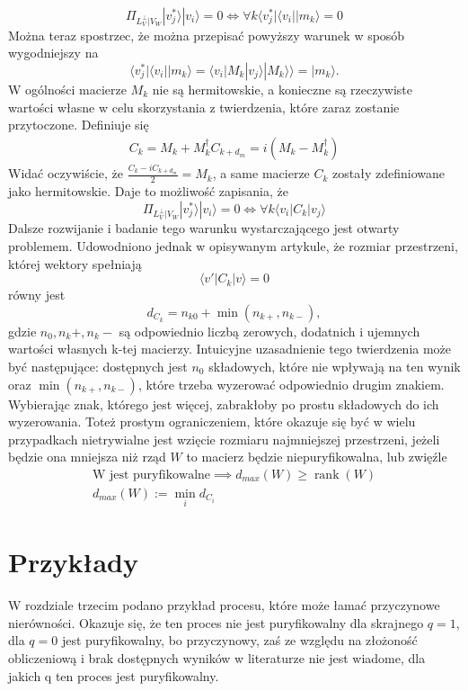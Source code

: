 \documentclass[10pt]{article} %
\DeclareMathOperator{\Rank}{rank}
\newcommand{\Ket}[1]{|#1\rangle}
\newcommand{\Bra}[1]{\langle#1|}
\newcommand{\KKet}[1]{|#1\rangle\rangle}
\newcommand{\LPV}{{L^\perp_V}}
\begin{document}
\begin{equation}
\Pi_{\LPV|V_W} \Ket{v^*_j}\Ket{v_i} = 0 \iff \forall k \Bra{v^*_j} \Bra{v_i} \Ket{m_k} = 0
\end{equation}
Można teraz spostrzec, że można przepisać powyższy warunek w sposób wygodniejszy na
\begin{equation}
\Bra{v^*_j} \Bra{v_i} \Ket{m_k} = \Bra{v_i} M_k \Ket{v_j}
\KKet{M_k} = \Ket{m_k}.
\end{equation}
W ogólności macierze $M_k$ nie są hermitowskie, a konieczne są rzeczywiste wartości własne w celu skorzystania z twierdzenia, które zaraz zostanie przytoczone.
Definiuje się
\begin{gather}
C_k = M_k + M^\dag_k
C_{k+d_m} = i(M_k - M_k^\dag)
\end{gather}
Widać oczywiście, że $\frac{C_k-iC_{k+d_m}}{2} = M_k$, a same macierze $C_k$ zostały zdefiniowane jako hermitowskie. Daje to możliwość zapisania, że
\begin{equation}
\Pi_{\LPV|V_W} \Ket{v^*_j}\Ket{v_i} = 0 \iff \forall k \Bra{v_i} C_k \Ket{v_j}
\end{equation}
Dalsze rozwijanie i badanie tego warunku wystarczającego jest otwarty problemem. Udowodniono jednak w opisywanym artykule, że
rozmiar przestrzeni, której wektory spełniają
\begin{equation}
\Bra{v'}C_k\Ket{v} = 0
\end{equation} równy jest 
\begin{equation}
d_{C_k} = n_{k0} + \min({n_{k+}, n_{k-}}),
\end{equation} gdzie $n_0, n_k+, n_k-$ są odpowiednio liczbą zerowych, dodatnich i ujemnych wartości własnych k-tej macierzy. Intuicyjne uzasadnienie tego twierdzenia może być następujące: dostępnych jest $n_0$ składowych, które nie wpływają na ten wynik oraz $\min({n_{k+}, n_{k-}})$, które trzeba wyzerować odpowiednio drugim znakiem. Wybierając znak, którego jest więcej, zabrakłoby po prostu składowych do ich wyzerowania.
Toteż prostym ograniczeniem, które okazuje się być w wielu przypadkach nietrywialne jest wzięcie rozmiaru najmniejszej przestrzeni, jeżeli będzie ona mniejsza niż rząd $W$ to macierz będzie niepuryfikowalna, lub zwięźle
\begin{gather}
\text{W jest puryfikowalne} \implies d_{max}(W) \geq \Rank(W) \\
d_{max}(W) := \min_i d_{C_i} 
\end{gather}
\section{Przykłady}
W rozdziale trzecim podano przykład procesu, które może łamać przyczynowe nierówności. Okazuje się, że ten proces nie jest puryfikowalny dla skrajnego $q = 1$, dla $q=0$ jest puryfikowalny, bo przyczynowy, zaś ze względu na złożoność obliczeniową i brak dostępnych wyników w literaturze nie jest wiadome, dla jakich q ten proces jest puryfikowalny.
\end{document}

